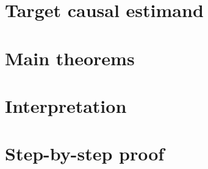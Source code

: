 \documentclass[11pt]{article}
\theoremstyle{definition}
\theoremstyle{plain}
\theoremstyle{remark}
\begin{document}
\section{Target causal estimand}

\section{Main theorems}

\section{Interpretation}

\section{Step-by-step proof}
\end{document}

